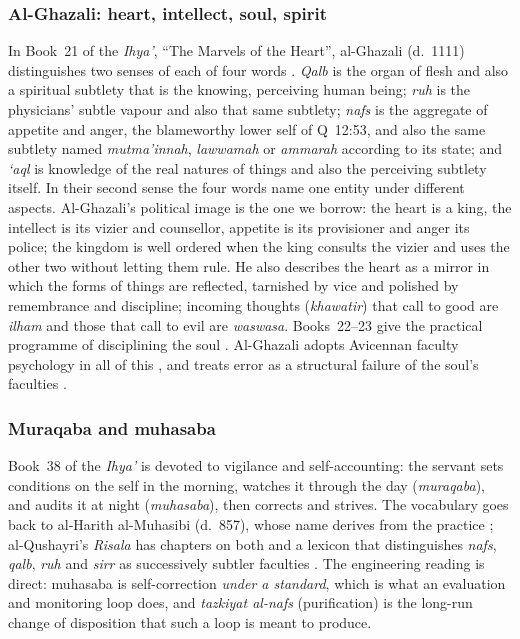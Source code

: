 \subsubsection{Al-Ghazali: heart, intellect, soul, spirit}
In Book~21 of the \emph{Ihya\textquoteright}, ``The Marvels of the Heart'',
al-Ghazali (d.~1111) distinguishes two senses of each of four words
\cite{Ghazali2010Marvels}. \emph{Qalb} is the organ of flesh and also a
spiritual subtlety that is the knowing, perceiving human being; \emph{ruh} is
the physicians' subtle vapour and also that same subtlety; \emph{nafs} is the
aggregate of appetite and anger, the blameworthy lower self of Q~12:53, and
also the same subtlety named \emph{mutma\textquoteright innah},
\emph{lawwamah} or \emph{ammarah} according to its state; and
\emph{\textquoteleft aql} is knowledge of the real natures of things and also
the perceiving subtlety itself. In their second sense the four words name one
entity under different aspects. Al-Ghazali's political image is the one we
borrow: the heart is a king, the intellect is its vizier and counsellor,
appetite is its provisioner and anger its police; the kingdom is well ordered
when the king consults the vizier and uses the other two without letting them
rule. He also describes the heart as a mirror in which the forms of things are
reflected, tarnished by vice and polished by remembrance and discipline;
incoming thoughts (\emph{khawatir}) that call to good are \emph{ilham} and
those that call to evil are \emph{waswasa}. Books~22--23 give the practical
programme of disciplining the soul \cite{Ghazali1995Disciplining}. Al-Ghazali
adopts Avicennan faculty psychology in all of this
\cite{Griffel2009,Griffel2026SEPGhazali,Kukkonen2012Receptive}, and treats
error as a structural failure of the soul's faculties
\cite{Kukkonen2016Error}.

\subsubsection{Muraqaba and muhasaba}
Book~38 of the \emph{Ihya\textquoteright} is devoted to vigilance and
self-accounting: the servant sets conditions on the self in the morning,
watches it through the day (\emph{muraqaba}), and audits it at night
(\emph{muhasaba}), then corrects and strives. The vocabulary goes back to
al-Harith al-Muhasibi (d.~857), whose name derives from the practice
\cite{Picken2011}; al-Qushayri's \emph{Risala} has chapters on both and a
lexicon that distinguishes \emph{nafs}, \emph{qalb}, \emph{ruh} and
\emph{sirr} as successively subtler faculties \cite{Qushayri2007Epistle}. The
engineering reading is direct: muhasaba is self-correction \emph{under a
standard}, which is what an evaluation and monitoring loop does, and
\emph{tazkiyat al-nafs} (purification) is the long-run change of disposition
that such a loop is meant to produce.

